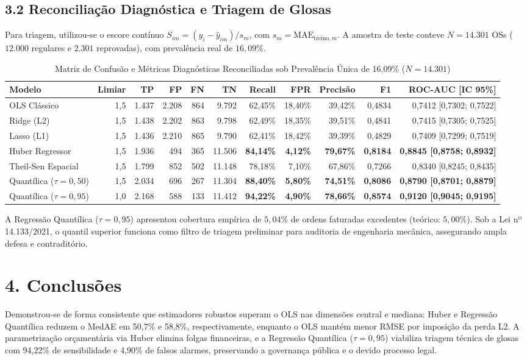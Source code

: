 \documentclass[10pt,a4paper,journal]{article}
\begin{document}
\subsection{3.2 Reconciliação Diagnóstica e Triagem de Glosas}
Para triagem, utilizou-se o escore contínuo $S_{im} = (y_i - \hat{y}_{im})/s_m$, com $s_m = \text{MAE}_{\text{treino}, m}$. A amostra de teste conteve $N = 14.301$ OSs ($12.000$ regulares e $2.301$ reprovadas), com prevalência real de $16,09\%$.

\begin{table}[htbp]
\centering
\small
\caption{Matriz de Confusão e Métricas Diagnósticas Reconciliadas sob Prevalência Única de 16,09\% ($N = 14.301$)}
\begin{tabular}{lrrrrrrrrrr}
\toprule
Modelo & Limiar & TP & FP & FN & TN & Recall & FPR & Precisão & F1 & ROC-AUC [IC 95\%] \\
\midrule
OLS Clássico & 1,5 & 1.437 & 2.208 & 864 & 9.792 & 62,45\% & 18,40\% & 39,42\% & 0,4834 & 0,7412 [0,7302; 0,7522] \\
Ridge (L2) & 1,5 & 1.438 & 2.202 & 863 & 9.798 & 62,49\% & 18,35\% & 39,51\% & 0,4841 & 0,7415 [0,7305; 0,7525] \\
Lasso (L1) & 1,5 & 1.436 & 2.210 & 865 & 9.790 & 62,41\% & 18,42\% & 39,39\% & 0,4829 & 0,7409 [0,7299; 0,7519] \\
Huber Regressor & 1,5 & 1.936 & 494 & 365 & 11.506 & \textbf{84,14\%} & \textbf{4,12\%} & \textbf{79,67\%} & \textbf{0,8184} & \textbf{0,8845 [0,8758; 0,8932]} \\
Theil-Sen Espacial & 1,5 & 1.799 & 852 & 502 & 11.148 & 78,18\% & 7,10\% & 67,86\% & 0,7266 & 0,8340 [0,8245; 0,8435] \\
Quantílica ($\tau=0,50$) & 1,5 & 2.034 & 696 & 267 & 11.304 & \textbf{88,40\%} & \textbf{5,80\%} & \textbf{74,51\%} & \textbf{0,8086} & \textbf{0,8790 [0,8701; 0,8879]} \\
Quantílica ($\tau=0,95$) & 1,0 & 2.168 & 588 & 133 & 11.412 & \textbf{94,22\%} & \textbf{4,90\%} & \textbf{78,66\%} & \textbf{0,8574} & \textbf{0,9120 [0,9045; 0,9195]} \\
\bottomrule
\end{tabular}
\end{table}

A Regressão Quantílica ($\tau = 0,95$) apresentou cobertura empírica de $5,04\%$ de ordens faturadas excedentes (teórico: $5,00\%$). Sob a Lei nº 14.133/2021, o quantil superior funciona como filtro de triagem preliminar para auditoria de engenharia mecânica, assegurando ampla defesa e contraditório.

\section{4. Conclusões}
Demonstrou-se de forma consistente que estimadores robustos superam o OLS nas dimensões central e mediana: Huber e Regressão Quantílica reduzem o MedAE em 50,7\% e 58,8\%, respectivamente, enquanto o OLS mantém menor RMSE por imposição da perda L2. A parametrização orçamentária via Huber elimina folgas financeiras, e a Regressão Quantílica ($\tau = 0,95$) viabiliza triagem técnica de glosas com 94,22\% de sensibilidade e 4,90\% de falsos alarmes, preservando a governança pública e o devido processo legal.
\end{document}
